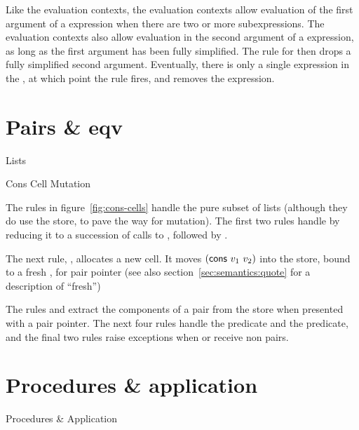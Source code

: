 Like the  evaluation contexts, the 
evaluation contexts allow evaluation of the first argument of a
 expression when there are two or more subexpressions.
The  evaluation contexts also allow evaluation in the
second argument of a  expression, as long as the first
argument has been fully simplified. The  rule for
 then drops a fully simplified second argument.
Eventually, there is only a single expression in the ,
at which point the  rule fires, and removes the
 expression.

\section{Pairs \& eqv}

\beginfig
\begin{center}

\end{center}
\caption{Lists}\label{fig:cons-cells}
\endfig

\beginfig
\begin{center}

\end{center}
\caption{Cons Cell Mutation}\label{fig:cons-cell-mutation}
\endfig

The rules in figure~\ref{fig:cons-cells} handle the pure subset of
lists (although they do use the store, to pave the way for mutation).
The first two rules handle  by reducing it to a
succession of calls to , followed by .

The next rule, , allocates a new  cell.
It moves $(\textnormal{\textsf{cons}}~v_1~v_2)$ into the store, bound to a fresh
, for pair pointer (see also section~\ref{sec:semantics:quote} for a description of ``fresh'')

The rules  and  extract the components of a pair from the store when presented with a pair pointer. The next four rules handle the  predicate and the  predicate, and the final two rules raise exceptions when  or  receive non pairs.

\section{Procedures \& application}

\beginfig
\begin{center}

\end{center}
\caption{Procedures \& Application}\label{fig:procedure-application}
\endfig

